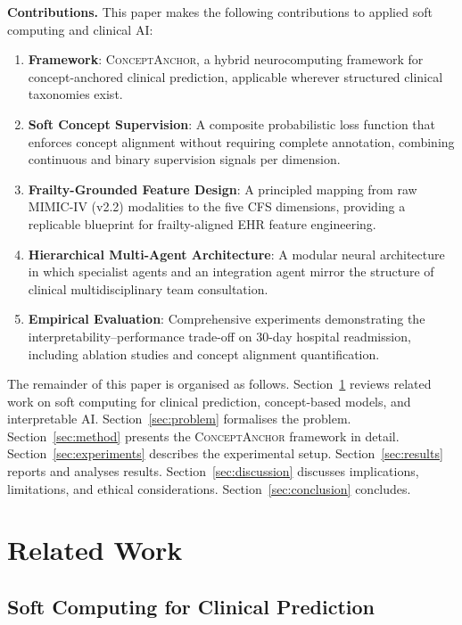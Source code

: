 \documentclass[review,12pt,authoryear]{elsarticle}
\newcommand{\modelname}{\textsc{ConceptAnchor}}
\newcommand{\dataset}{MIMIC-IV (v2.2)}
\begin{document}
\textbf{Contributions.} This paper makes the following contributions to applied soft computing and clinical AI:
\begin{enumerate}[leftmargin=*, label=\arabic*., noitemsep]
  \item \textbf{Framework}: \modelname, a hybrid neurocomputing framework for concept-anchored clinical prediction, applicable wherever structured clinical taxonomies exist.
  \item \textbf{Soft Concept Supervision}: A composite probabilistic loss function that enforces concept alignment without requiring complete annotation, combining continuous and binary supervision signals per dimension.
  \item \textbf{Frailty-Grounded Feature Design}: A principled mapping from raw \dataset{} modalities to the five CFS dimensions, providing a replicable blueprint for frailty-aligned EHR feature engineering.
  \item \textbf{Hierarchical Multi-Agent Architecture}: A modular neural architecture in which specialist agents and an integration agent mirror the structure of clinical multidisciplinary team consultation.
  \item \textbf{Empirical Evaluation}: Comprehensive experiments demonstrating the interpretability–performance trade-off on 30-day hospital readmission, including ablation studies and concept alignment quantification.
\end{enumerate}

The remainder of this paper is organised as follows.
Section~\ref{sec:related} reviews related work on soft computing for clinical prediction, concept-based models, and interpretable AI.
Section~\ref{sec:problem} formalises the problem.
Section~\ref{sec:method} presents the \modelname{} framework in detail.
Section~\ref{sec:experiments} describes the experimental setup.
Section~\ref{sec:results} reports and analyses results.
Section~\ref{sec:discussion} discusses implications, limitations, and ethical considerations.
Section~\ref{sec:conclusion} concludes.

\section{Related Work}
\label{sec:related}

\subsection{Soft Computing for Clinical Prediction}
\end{document}
